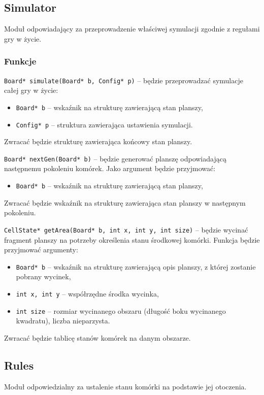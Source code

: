 \documentclass{mwart}
\begin{document}
\subsection{Simulator}
Moduł odpowiadający za przeprowadzenie właściwej symulacji zgodnie z regułami gry w życie.

\subsubsection{Funkcje}
\texttt{Board* simulate(Board* b, Config* p)} -- będzie przeprowadzać symulacje\\ całej gry w życie:
\begin{itemize}[label={}]
	\item \texttt{Board* b} -- wskaźnik na strukturę zawierającą stan planszy,
	\item \texttt{Config* p} -- struktura zawierająca ustawienia symulacji.
\end{itemize}
Zwracać będzie strukturę zawierająca końcowy stan planszy.

\vspace{5mm}

\noindent{}\texttt{Board* nextGen(Board* b)} -- będzie generować planszę odpowiadającą następnemu pokoleniu komórek. Jako argument będzie przyjmować:
\begin{itemize}[label={}]
	\item \texttt{Board* b} -- wskaźnik na strukturę zawierającą stan planszy,
\end{itemize}
Zwracać będzie wskaźnik na strukturę zawierająca stan planszy w następnym pokoleniu.

\noindent{}\texttt{CellState* getArea(Board* b, int x, int y, int size)} -- będzie wycinać fragment planszy na potrzeby określenia stanu środkowej komórki. Funkcja będzie przyjmować argumenty:
\begin{itemize}[label={}]
	\item \texttt{Board* b} -- wskaźnik na strukturę zawierającą opis planszy, z której zostanie pobrany wycinek,
	\item \texttt{int x, int y} -- współrzędne środka wycinka,
	\item \texttt{int size} -- rozmiar wycinanego obszaru (długość boku wycinanego kwadratu), liczba nieparzysta.
\end{itemize}
Zwracać będzie tablicę stanów komórek na danym obszarze.

\subsection{Rules}
Moduł odpowiedzialny za ustalenie stanu komórki na podstawie jej otoczenia.
\end{document}
